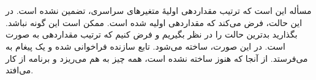 \section{}
\paragraph{}\label{answer:111}
مسأله این است که ترتیب مقداردهی اولیهٔ متغیرهای سراسری، تضمین نشده است. در این حالت،  فرض می‌کند که  مقداردهی اولیه شده است. ممکن است این گونه نباشد. بگذارید بدترین حالت را در نظر بگیریم و فرض کنیم که ترتیب مقداردهی به صورت  است. در این صورت،  ساخته می‌شود. تابع سازنده فراخوانی شده و یک پیغام به  می‌فرستد. از آنجا که  هنوز ساخته نشده است، همه چیز به هم می‌ریزد و برنامه از کار می‌افتد.